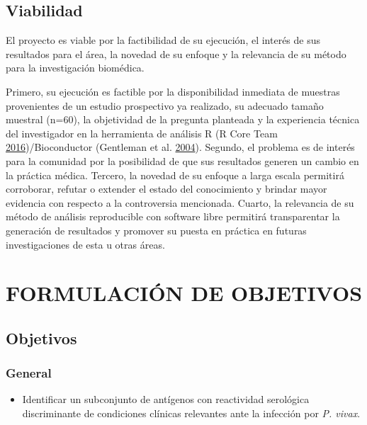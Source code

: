 \documentclass[
  a4paper]{article}
\providecommand{\tightlist}{%
  \setlength{\itemsep}{0pt}\setlength{\parskip}{0pt}}
\begin{document}
\hypertarget{viabilidad}{%
\subsection{Viabilidad}\label{viabilidad}}

El proyecto es viable por la factibilidad de su ejecución, el interés de
sus resultados para el área, la novedad de su enfoque y la relevancia de
su método para la investigación biomédica.

Primero, su ejecución es factible por la disponibilidad inmediata de
muestras provenientes de un estudio prospectivo ya realizado, su
adecuado tamaño muestral (n=60), la objetividad de la pregunta planteada
y la experiencia técnica del investigador en la herramienta de análisis
R (R Core Team \protect\hyperlink{ref-R2016}{2016})/Bioconductor
(Gentleman et al. \protect\hyperlink{ref-bioconductor2004}{2004}).
Segundo, el problema es de interés para la comunidad por la posibilidad
de que sus resultados generen un cambio en la práctica médica. Tercero,
la novedad de su enfoque a larga escala permitirá corroborar, refutar o
extender el estado del conocimiento y brindar mayor evidencia con
respecto a la controversia mencionada. Cuarto, la relevancia de su
método de análisis reproducible con software libre permitirá
transparentar la generación de resultados y promover su puesta en
práctica en futuras investigaciones de esta u otras áreas.

\hypertarget{formulaciuxf3n-de-objetivos}{%
\section{FORMULACIÓN DE OBJETIVOS}\label{formulaciuxf3n-de-objetivos}}

\hypertarget{objetivos}{%
\subsection{Objetivos}\label{objetivos}}

\hypertarget{general}{%
\subsubsection{General}\label{general}}

\begin{itemize}
\tightlist
\item
  Identificar un subconjunto de antígenos con reactividad serológica
  discriminante de condiciones clínicas relevantes ante la infección por
  \emph{P. vivax}.
\end{itemize}
\end{document}
